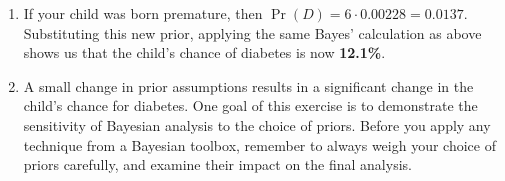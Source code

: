 \documentclass{harvardml}
\theoremstyle{definition}
\theoremstyle{plain}
\begin{document}
\begin{problem}
\begin{enumerate}[label=(\alph*)]
\item If your child was born premature, then $\Pr(D) = 6 \cdot 0.00228 = 0.0137$.
Substituting this new prior, applying the same Bayes' calculation as above shows
us that the child's chance of diabetes is now \textbf{12.1\%}.

\item A small change in prior assumptions results in a significant change in
the child's chance for diabetes. One goal of this exercise is to demonstrate the
sensitivity of Bayesian analysis to the choice of priors. Before you apply any
technique from a Bayesian toolbox, remember to always weigh your choice of priors
carefully, and examine their impact on the final analysis.
\end{enumerate}
\end{problem}
\end{document}
